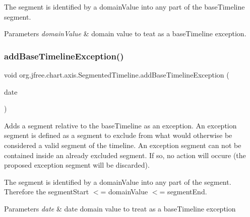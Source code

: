 The segment is identified by a domain\+Value into any part of the base\+Timeline segment.


\begin{DoxyParams}{Parameters}
{\em domain\+Value} & domain value to teat as a base\+Timeline exception. \\
\hline
\end{DoxyParams}
\mbox{\label{classorg_1_1jfree_1_1chart_1_1axis_1_1_segmented_timeline_ad5b28591221b3b9c2a50eaea48bc5e92}} 
\subsubsection{\texorpdfstring{add\+Base\+Timeline\+Exception()}{addBaseTimelineException()}\hspace{0.1cm}{\footnotesize\ttfamily [2/2]}}
{\footnotesize\ttfamily void org.\+jfree.\+chart.\+axis.\+Segmented\+Timeline.\+add\+Base\+Timeline\+Exception (\begin{DoxyParamCaption}\item[{Date}]{date }\end{DoxyParamCaption})}

Adds a segment relative to the base\+Timeline as an exception. An exception segment is defined as a segment to exclude from what would otherwise be considered a valid segment of the timeline. An exception segment can not be contained inside an already excluded segment. If so, no action will occure (the proposed exception segment will be discarded). 

The segment is identified by a domain\+Value into any part of the segment. Therefore the segment\+Start $<$= domain\+Value $<$= segment\+End.


\begin{DoxyParams}{Parameters}
{\em date} & date domain value to treat as a base\+Timeline exception \\
\hline
\end{DoxyParams}
\mbox{\label{classorg_1_1jfree_1_1chart_1_1axis_1_1_segmented_timeline_ad6c2ee3c174c0bec87e5f860ebb14bae}} 
